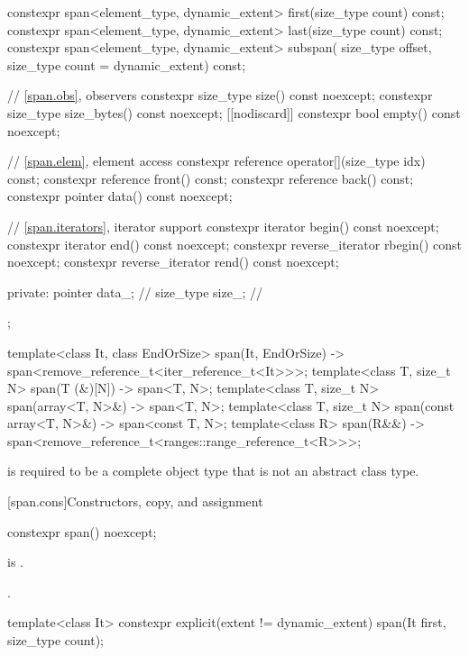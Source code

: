 \begin{codeblock}
{{    constexpr span<element_type, dynamic_extent> first(size_type count) const;
    constexpr span<element_type, dynamic_extent> last(size_type count) const;
    constexpr span<element_type, dynamic_extent> subspan(
      size_type offset, size_type count = dynamic_extent) const;

    // \ref{span.obs}, observers
    constexpr size_type size() const noexcept;
    constexpr size_type size_bytes() const noexcept;
    [[nodiscard]] constexpr bool empty() const noexcept;

    // \ref{span.elem}, element access
    constexpr reference operator[](size_type idx) const;
    constexpr reference front() const;
    constexpr reference back() const;
    constexpr pointer data() const noexcept;

    // \ref{span.iterators}, iterator support
    constexpr iterator begin() const noexcept;
    constexpr iterator end() const noexcept;
    constexpr reverse_iterator rbegin() const noexcept;
    constexpr reverse_iterator rend() const noexcept;

  private:
    pointer data_;              // \expos
    size_type size_;            // \expos
  };

  template<class It, class EndOrSize>
    span(It, EndOrSize) -> span<remove_reference_t<iter_reference_t<It>>>;
  template<class T, size_t N>
    span(T (&)[N]) -> span<T, N>;
  template<class T, size_t N>
    span(array<T, N>&) -> span<T, N>;
  template<class T, size_t N>
    span(const array<T, N>&) -> span<const T, N>;
  template<class R>
    span(R&&) -> span<remove_reference_t<ranges::range_reference_t<R>>>;
}
\end{codeblock}

\pnum
{} is required to be
a complete object type that is not an abstract class type.

[span.cons]{Constructors, copy, and assignment}

%
\begin{itemdecl}
constexpr span() noexcept;
\end{itemdecl}

\begin{itemdescr}
\pnum
\constraints
{} is .

\pnum
\ensures
{}.
\end{itemdescr}

%
\begin{itemdecl}
template<class It>
  constexpr explicit(extent != dynamic_extent) span(It first, size_type count);
\end{itemdecl}

